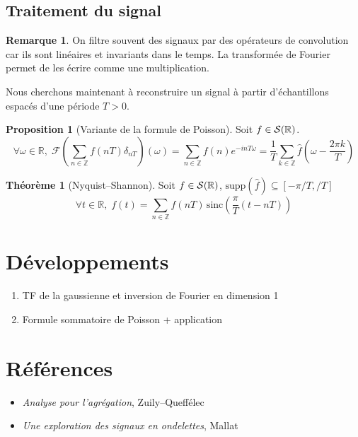 \documentclass[11pt,a4paper,twocolumn]{article}
\theoremstyle{definition}
\newtheorem{proposition}[equation]{Proposition}
\newtheorem{theorem}[equation]{Théorème}
\newtheorem{remark}[equation]{Remarque}
\newcounter{n}
\def\F{\mathbb{F}}
\def\Z{\mathbb{Z}}
\def\R{\mathbb{R}}
\def\S{{\cal{S}}}
\def\F{\mathcal{F}}
\def\hf{\hat{f}}
\begin{document}
\subsection{Traitement du signal}

\begin{remark}
  On filtre souvent des signaux par des opérateurs de convolution car ils sont
  linéaires et invariants dans le temps. La transformée de Fourier permet de les
  écrire comme une multiplication.
\end{remark}

Nous cherchons maintenant à reconstruire un signal à partir d'échantillons
espacés d'une période $T > 0$.

\begin{proposition}[Variante de la formule de Poisson]
  Soit $f \in \S(\R)$.
  \[ \forall \omega \in \R, \;
    \F\left( \sum_{n \in \Z} f(nT)\delta_{nT} \right)(\omega) =
    \sum_{n \in \Z} f(n)e^{-inT\omega} =
    \frac{1}{T} \sum_{k \in \Z} \hf\left(\omega - \frac{2\pi k}{T}\right) \]
\end{proposition}

\begin{theorem}[Nyquist--Shannon]
  Soit $f \in \S(\R)$, $\mathrm{supp}(\hf) \subseteq [-\pi/T,/T]$
  \[ \forall t \in \R,\; f(t) = \sum_{n \in \Z} f(nT)\,\mathrm{sinc}\left(
    \frac{\pi}{T}(t - nT)\right) \]
\end{theorem}



\section*{Développements}

\begin{enumerate}
\item TF de la gaussienne et inversion de Fourier en dimension 1
\item Formule sommatoire de Poisson + application
\end{enumerate}

\section*{Références}

\begin{itemize}
\item \emph{Analyse pour l'agrégation}, Zuily--Queffélec
\item \emph{Une exploration des signaux en ondelettes}, Mallat
\end{itemize}
\end{document}
